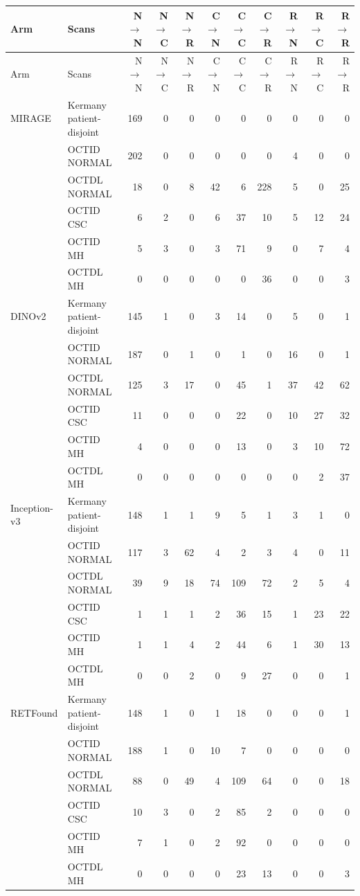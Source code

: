 \begin{longtable}{@{}llrrrrrrrrr@{}}
\toprule
Arm & Scans & N$\to$N & N$\to$C & N$\to$R & C$\to$N & C$\to$C & C$\to$R & R$\to$N & R$\to$C & R$\to$R \\
\midrule
\endfirsthead
\toprule
Arm & Scans & N$\to$N & N$\to$C & N$\to$R & C$\to$N & C$\to$C & C$\to$R & R$\to$N & R$\to$C & R$\to$R \\
\midrule
\endhead
\bottomrule
\endfoot
\bottomrule
\endlastfoot
MIRAGE & Kermany patient-disjoint & 169 & 0 & 0 & 0 & 0 & 0 & 0 & 0 & 0 \\
 & OCTID NORMAL & 202 & 0 & 0 & 0 & 0 & 0 & 4 & 0 & 0 \\
 & OCTDL NORMAL & 18 & 0 & 8 & 42 & 6 & 228 & 5 & 0 & 25 \\
 & OCTID CSC & 6 & 2 & 0 & 6 & 37 & 10 & 5 & 12 & 24 \\
 & OCTID MH & 5 & 3 & 0 & 3 & 71 & 9 & 0 & 7 & 4 \\
 & OCTDL MH & 0 & 0 & 0 & 0 & 0 & 36 & 0 & 0 & 3 \\
\addlinespace[1pt]
DINOv2 & Kermany patient-disjoint & 145 & 1 & 0 & 3 & 14 & 0 & 5 & 0 & 1 \\
 & OCTID NORMAL & 187 & 0 & 1 & 0 & 1 & 0 & 16 & 0 & 1 \\
 & OCTDL NORMAL & 125 & 3 & 17 & 0 & 45 & 1 & 37 & 42 & 62 \\
 & OCTID CSC & 11 & 0 & 0 & 0 & 22 & 0 & 10 & 27 & 32 \\
 & OCTID MH & 4 & 0 & 0 & 0 & 13 & 0 & 3 & 10 & 72 \\
 & OCTDL MH & 0 & 0 & 0 & 0 & 0 & 0 & 0 & 2 & 37 \\
\addlinespace[1pt]
Inception-v3 & Kermany patient-disjoint & 148 & 1 & 1 & 9 & 5 & 1 & 3 & 1 & 0 \\
 & OCTID NORMAL & 117 & 3 & 62 & 4 & 2 & 3 & 4 & 0 & 11 \\
 & OCTDL NORMAL & 39 & 9 & 18 & 74 & 109 & 72 & 2 & 5 & 4 \\
 & OCTID CSC & 1 & 1 & 1 & 2 & 36 & 15 & 1 & 23 & 22 \\
 & OCTID MH & 1 & 1 & 4 & 2 & 44 & 6 & 1 & 30 & 13 \\
 & OCTDL MH & 0 & 0 & 2 & 0 & 9 & 27 & 0 & 0 & 1 \\
\addlinespace[1pt]
RETFound & Kermany patient-disjoint & 148 & 1 & 0 & 1 & 18 & 0 & 0 & 0 & 1 \\
 & OCTID NORMAL & 188 & 1 & 0 & 10 & 7 & 0 & 0 & 0 & 0 \\
 & OCTDL NORMAL & 88 & 0 & 49 & 4 & 109 & 64 & 0 & 0 & 18 \\
 & OCTID CSC & 10 & 3 & 0 & 2 & 85 & 2 & 0 & 0 & 0 \\
 & OCTID MH & 7 & 1 & 0 & 2 & 92 & 0 & 0 & 0 & 0 \\
 & OCTDL MH & 0 & 0 & 0 & 0 & 23 & 13 & 0 & 0 & 3 \\
\end{longtable}
